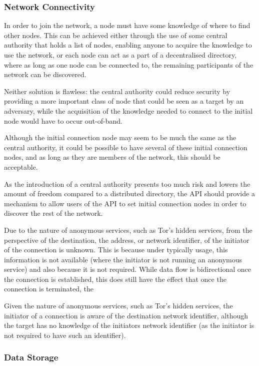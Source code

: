 		\subsubsection{Network Connectivity}
			In order to join the network, a node must have some knowledge of where to find other nodes. This can be achieved either through the use of some central authority that holds a list of nodes, enabling anyone to acquire the knowledge to use the network, or each node can act as a part of a decentralised directory, where as long as one node can be connected to, the remaining participants of the network can be discovered.
			
			Neither solution is flawless: the central authority could reduce security by providing a more important class of node that could be seen as a target by an adversary, while the acquisition of the knowledge needed to connect to the initial node would have to occur out-of-band.
			
			Although the initial connection node may seem to be much the same as the central authority, it could be possible to have several of these initial connection nodes, and as long as they are members of the network, this should be acceptable.
			
			As the introduction of a central authority presents too much risk and lowers the amount of freedom compared to a distributed directory, the API should provide a mechanism to allow users of the API to set initial connection nodes in order to discover the rest of the network.
			
			Due to the nature of anonymous services, such as Tor's hidden services, from the perspective of the destination, the address, or network identifier, of the initiator of the connection is unknown. This is because under typically usage, this information is not available (where the initiator is not running an anonymous service) and also because it is not required. While data flow is bidirectional once the connection is established, this does still have the effect that once the connection is terminated, the 
			
			Given the nature of anonymous services, such as Tor's hidden services, the initiator of a connection is aware of the destination network identifier, although the target has no knowledge of the initiators network identifier (as the initiator is not required to have such an identifier). 
			
		\subsubsection{Data Storage}
			
